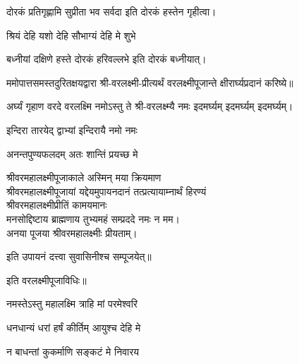 \begin{center}
{दोरकं प्रतिगृह्णामि सुप्रीता भव सर्वदा} 
इति दोरकं हस्तेन गृहीत्वा।


{श्रियं देहि यशो देहि सौभाग्यं देहि मे शुभे}

{बध्नीयां दक्षिणे हस्ते दोरकं हरिवल्लभे}
इति दोरकं बध्नीयात्।


ममोपात्तसमस्तदुरितक्षयद्वारा श्री-वरलक्ष्मी-प्रीत्यर्थं वरलक्ष्मीपूजान्ते क्षीरार्घ्यप्रदानं करिष्ये॥

{अर्घ्यं गृहाण वरदे वरलक्ष्मि नमोऽस्तु ते} 
श्री-वरलक्ष्म्यै नमः इदमर्घ्यम् इदमर्घ्यम् इदमर्घ्यम्।


{इन्दिरा तारयेद् द्वाभ्यां इन्दिरायै नमो नमः}

{अनन्तपुण्यफलदम् अतः शान्तिं प्रयच्छ मे}

श्रीवरमहालक्ष्मीपूजाकाले अस्मिन् मया क्रियमाण\\
श्रीवरमहालक्ष्मीपूजायां यद्देयमुपायनदानं तत्प्रत्यायाम्नार्थं हिरण्यं\\
श्रीवरमहालक्ष्मीप्रीतिं कामयमानः\\
मनसोद्दिष्टाय ब्राह्मणाय तुभ्यमहं सम्प्रददे नमः न मम।\\ 
अनया पूजया श्रीवरमहालक्ष्मीः प्रीयताम्। 

इति उपायनं दत्त्वा सुवासिनीश्च सम्पूजयेत्॥


इति वरलक्ष्मीपूजाविधिः॥

\end{center}





{नमस्तेऽस्तु महालक्ष्मि त्राहि मां परमेश्वरि}

{धनधान्यं धरां हर्षं कीर्तिम् आयुश्च देहि मे}

{न बाधन्तां कुकर्माणि सङ्कटं मे निवारय}





